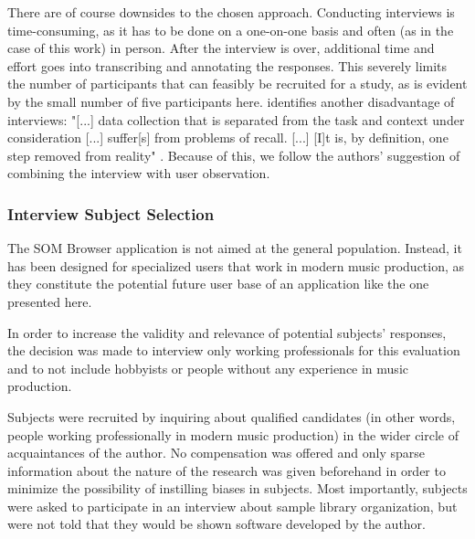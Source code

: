 \smallskip

There are of course downsides to the chosen approach. Conducting
interviews is time-consuming, as it has to be done on a one-on-one basis and
often (as in the case of this work) in person. After the interview is over,
additional time and effort goes into transcribing and annotating the responses.
This severely limits the number of participants that can feasibly be recruited
for a study, as is evident by the small number of five participants here.
\citet{lazar2017} identifies another disadvantage of interviews: "[...] data
collection that is separated from the task and context under consideration [...]
suffer[s] from problems of recall. [...] [I]t is, by definition, one step
removed from reality" \citep[p.188ff.]{lazar2017}. Because of this, we follow
the authors' suggestion of combining the interview with user observation.

\subsubsection{Interview Subject Selection}
\label{subsubsec:subject_selection}
The SOM Browser application is not aimed at the general population. Instead, it
has been designed for specialized users that work in modern music production, as
they constitute the potential future user base of an application like the one
presented here.

\smallskip

In order to increase the validity and relevance of potential subjects'
responses, the decision was made to interview only working professionals for
this evaluation and to not include hobbyists or people without any experience in
music production.

\smallskip

Subjects were recruited by inquiring about qualified candidates (in other words,
people working professionally in modern music production) in the wider circle of
acquaintances of the author. No compensation was offered and only sparse
information about the nature of the research was given beforehand in order to
minimize the possibility of instilling biases in subjects. Most importantly,
subjects were asked to participate in an interview about sample library
organization, but were not told that they would be shown software developed by
the author.

